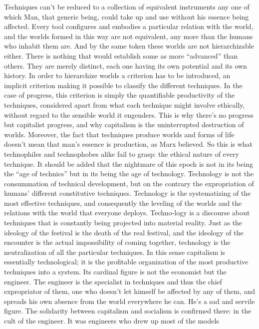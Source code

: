 \documentclass[landscape,twocolumn,letterpaper]{article}
\begin{document}
Techniques can’t be reduced to a collection of equivalent instruments
any one of which Man, that generic being, could take up and use
without his essence being affected. Every tool configures and embodies
a particular relation with the world, and the worlds formed in this
way are not equivalent, any more than the humans who inhabit them
are. And by the same token these worlds are not hierarchizable
either. There is nothing that would establish some as more “advanced”
than others. They are merely distinct, each one having its own
potential and its own history. In order to hierarchize worlds a
criterion has to be introduced, an implicit criterion making it
possible to classify the different techniques. In the case of
progress, this criterion is simply the quantifiable productivity of
the techniques, considered apart from what each technique might
involve ethically, without regard to the sensible world it
engenders. This is why there’s no progress but capitalist progress,
and why capitalism is the uninterrupted destruction of
worlds. Moreover, the fact that techniques produce worlds and forms of
life doesn’t mean that man’s essence is production, as Marx
believed. So this is what technophiles and technophobes alike fail to
grasp: the ethical nature of every technique. It should be added that
the nightmare of this epoch is not in its being the “age of technics”
but in its being the age of technology. Technology is not the
consummation of technical development, but on the contrary the
expropriation of humans’ different constitutive techniques. Technology
is the systematizing of the most effective techniques, and
consequently the leveling of the worlds and the relations with the
world that everyone deploys. Techno-logy is a discourse about
techniques that is constantly being projected into material
reality. Just as the ideology of the festival is the death of the real
festival, and the ideology of the encounter is the actual
impossibility of coming together, technology is the neutralization of
all the particular techniques. In this sense capitalism is essentially
technological; it is the profitable organization of the most
productive techniques into a system. Its cardinal figure is not the
economist but the engineer. The engineer is the specialist in
techniques and thus the chief expropriator of them, one who doesn’t
let himself be affected by any of them, and spreads his own absence
from the world everywhere he can. He’s a sad and servile figure. The
solidarity between capitalism and socialism is confirmed there: in the
cult of the engineer. It was engineers who drew up most of the models
\end{document}
